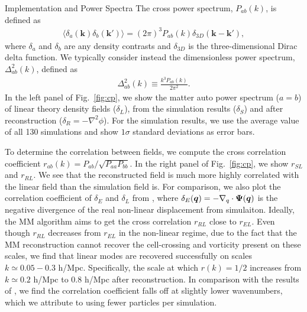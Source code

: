 \begin{section}{Implementation and Power Spectra}
 The cross power spectrum, $P_{ab}(k)$, is defined as
 \begin{align}
   \langle \delta_a(\bm{k})\delta_b(\bm{k'}) \rangle =
   (2\pi)^3 P_{ab}(k) \delta_{3D}(\bm{k}-\bm{k'}),
 \end{align}
 where $\delta_{a}$ and $\delta_{b}$ are any density contrasts and
 $\delta_{3D}$ is the three-dimensional Dirac delta function. We typically consider instead
 the dimensionless power spectrum, $\Delta_{ab}^2(k)$, defined as
 \begin{align}
   \Delta_{ab}^2(k) \equiv \frac{k^3 P_{ab}(k)}{2\pi ^2}.
 \end{align}
 In the left panel of Fig.~\ref{fig:cp}, we show the matter auto power
 spectrum ($a=b$) of linear theory density fields ($\delta_L$), from
 the simulation results ($\delta_S$) and after reconstruction
 ($\delta_R=-\nabla^2\phi$).  For the simulation
 results, we use the average value of all 130 simulations and show
 $1\sigma$ standard deviations as error bars.  

 To determine the correlation
 between fields, we compute the cross correlation coefficient
 $r_{ab}(k) = P_{ab}/\sqrt{P_{aa}P_{bb}}$.  In the right panel of
 Fig.~\ref{fig:cp}, we show $r_{SL}$ and $r_{RL}$.  We see that the
 reconstructed field is much more highly correlated with the linear
 field than the simulation field is.  For comparison, we also plot the 
 correlation coefficient of $\delta_E$ 
 and $\delta_L$ from \citet{bib:Yu2016}, 
 where $\delta_E(\boldsymbol{q})= - \nabla_q \cdot \boldsymbol{\Psi}(\boldsymbol{q})$ is the 
 negative divergence of the real non-linear displacement from simulaiton. 
 Ideally, the MM algorithm aims to get the cross correlation $r_{RL}$ close to $r_{EL}$. 
 Even though $r_{RL}$ decreases from $r_{EL}$ in the non-linear regime, due to the fact that the MM reconstruction 
 cannot recover the cell-crossing and vorticity present on these scales, we find that linear modes are recovered successfully on scales $k\simeq 0.05 - 0.3$ h/Mpc.
 Specifically, the scale at which $r(k)=1/2$ increases from $k\simeq 0.2$ h/Mpc to
 $0.8$ h/Mpc after reconstruction.  In comparison with the results of \citet{bib:ZhuH2016},
 we find the correlation coefficient falls off at slightly lower
 wavenumbers, which we attribute to using fewer particles per simulation.


\end{section}
